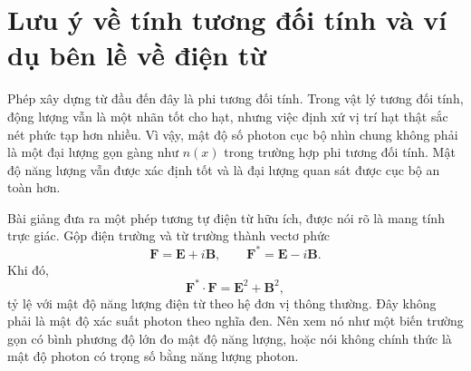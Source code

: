 \begin{classroomqa}
\end{classroomqa}

\section{Lưu ý về tính tương đối tính và ví dụ bên lề về điện từ}

Phép xây dựng từ đầu đến đây là phi tương đối tính. Trong vật lý tương đối tính, động lượng vẫn là một nhãn tốt cho hạt, nhưng việc định xứ vị trí hạt thật sắc nét phức tạp hơn nhiều. Vì vậy, mật độ số photon cục bộ nhìn chung không phải là một đại lượng gọn gàng như \(n(x)\) trong trường hợp phi tương đối tính. Mật độ năng lượng vẫn được xác định tốt và là đại lượng quan sát được cục bộ an toàn hơn.

Bài giảng đưa ra một phép tương tự điện từ hữu ích, được nói rõ là mang tính trực giác. Gộp điện trường và từ trường thành vectơ phức
\begin{equation}
\mathbf F=\mathbf E+i\mathbf B,
\qquad
\mathbf F^*=\mathbf E-i\mathbf B.
\label{eq:l07-riemann-silberstein}
\end{equation}
Khi đó,
\begin{equation}
\mathbf F^*\mathbin{\cdot}\mathbf F
=\mathbf E^2+\mathbf B^2,
\label{eq:l07-em-density}
\end{equation}
tỷ lệ với mật độ năng lượng điện từ theo hệ đơn vị thông thường. Đây không phải là mật độ xác suất photon theo nghĩa đen. Nên xem nó như một biến trường gọn có bình phương độ lớn đo mật độ năng lượng, hoặc nói không chính thức là mật độ photon có trọng số bằng năng lượng photon.

\begin{classroomqa}
\end{classroomqa}

